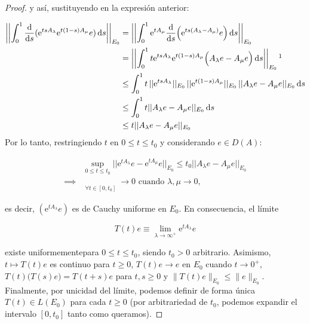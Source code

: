 \begin{proof}
    y así, sustituyendo en la expresión anterior:

    \begin{align*}
        \left | \left | \int_0^1 \frac{\dd}{\dd s}(\mathrm{e}^{tsA_\lambda}\mathrm{e}^{t(1-s)A_\mu}e) \, \dd s \right | \right |_{E_0} &= \left | \left | \int_0^1 \mathrm{e}^{tA_\mu}\frac{\dd}{\dd s}\Big(\mathrm{e}^{ts(A_\lambda - A_\mu)}e\Big) \, \dd s \right | \right |_{E_0}\\
        &= \left | \left | \int_0^1 t\mathrm{e}^{tsA_\lambda}\mathrm{e}^{t(1-s)A_\mu}\Big(A_\lambda e - A_\mu e\Big) \, \dd s \right | \right |_{E_0}\footnotemark\\
        &\leq\int_0^1 t \, ||\mathrm{e}^{tsA_\lambda}||_{E_0} \, ||\mathrm{e}^{t(1-s)A_\mu}||_{E_0} \, ||A_\lambda e - A_\mu e||_{E_0} \, \dd s\\
        &\leq \int_0^1 t ||A_\lambda e - A_\mu e||_{E_0} \, \dd s\\
        &\leq t ||A_\lambda e - A_\mu e||_{E_0}
    \end{align*}
    Por lo tanto, restringiendo $t$ en $0 \leq t \leq t_0$ y considerando $e \in D(A)$:

    \begin{align*}
        &\sup_{0 \leq t \leq t_0} ||\mathrm{e}^{tA_\lambda}e - \mathrm{e}^{tA_\mu}e||_{E_0} \leq t_0 ||A_\lambda e - A_\mu e||_{E_0}\\
        \implies& \mathop{\left\lVert \mathrm{e}^{tA_\lambda}e - \mathrm{e}^{tA_\mu}e \right\rVert_{E_0}} \limits_{\displaystyle \forall t \in [0, t_0]} \rightarrow 0 \text{ cuando } \lambda, \mu \rightarrow 0,
    \end{align*}

    es decir, $(\mathrm{e}^{tA_\lambda}e)$ es de Cauchy uniforme en $E_0$. En consecuencia, el límite

    \[T(t)e \equiv \lim_{\lambda \rightarrow \infty^+} \mathrm{e}^{tA_\lambda}e\]

    existe uniformemente\footnotemark para $0 \leq t \leq t_0$, siendo $t_0 > 0$ arbitrario.
    Asimismo, $t \mapsto T(t)e$ es continuo para $t \geq 0$, $T(t)e \rightarrow e$ en $E_0$ cuando $t \rightarrow 0^+$, $T(t)\big(T(s)e\big) = T(t+s)e$ para $t,s \geq 0$ y $\lVert T(t)e\rVert_{E_0} \leq \lVert e \rVert_{E_0}$. Finalmente, por unicidad del límite, podemos definir de forma única\footnotemark $T(t) \in L(E_0)$ para cada $t \geq 0$ (por arbitrariedad de $t_0$, podemos expandir el intervalo $[0, t_0]$ tanto como queramos).
    

\end{proof}
